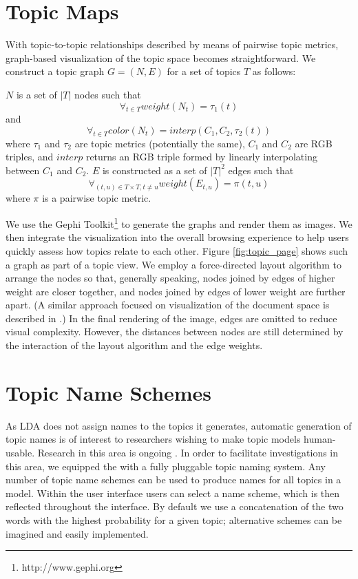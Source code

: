 \documentclass[11pt]{article}
\begin{document}
\section{Topic Maps}\label{sec:maps}
With topic-to-topic relationships described by means of pairwise topic metrics,
graph-based visualization of the topic space becomes straightforward.  We
construct a topic graph $G = (N, E)$ for a set of topics $T$ as follows:

$N$ is a set of $|T|$ nodes such that
\[\forall_{t\in T} weight(N_{t}) = \tau_{1}(t)\]
and
\[\forall_{t\in T} color(N_{t}) = interp(C_{1}, C_{2}, \tau_{2}(t))\]
where $\tau_1$ and $\tau_2$ are topic metrics (potentially the same), $C_{1}$ and
$C_{2}$ are RGB triples, and $interp$ returns an RGB triple formed by linearly interpolating
between $C_{1}$ and $C_{2}$. $E$ is
constructed as a set of $|T|^2$ edges such that
  \[\forall_{(t,u)\in T\times T, t\neq u} weight(E_{t,u}) = \pi(t,u)\]
where $\pi$ is a pairwise topic metric.

We use the Gephi Toolkit\footnote{http://www.gephi.org} to generate the graphs and
render them as images. We then integrate the visualization into the overall
browsing experience to help users quickly assess how topics relate to each
other. Figure \ref{fig:topic_page} shows such a graph as part of a topic view. 
We employ a force-directed layout algorithm to arrange
the nodes so that, generally speaking, nodes joined by edges of higher weight
are closer together, and nodes joined by edges of lower weight are further
apart. (A similar approach focused on visualization of the document space is
described in .) In the final rendering of the image, edges 
are omitted to reduce visual complexity. However, the distances between nodes
are still determined by the interaction of the layout algorithm and the edge
weights.

\section{Topic Name Schemes}
As LDA does not assign names to the topics it generates, automatic generation of
topic names is of interest to researchers wishing to make topic models
human-usable. Research in this area is ongoing \cite{Mei2007,Lau2010}. In order to
facilitate investigations in this area, we equipped the \tool{} with a
fully pluggable topic naming system. Any number of topic name schemes can be
used to produce names for all topics in a model. Within the user interface
users can select a name scheme, which is then reflected throughout the
interface. By default we use a concatenation of the two
words with the highest probability for a given topic; alternative schemes
can be imagined and easily implemented.%
\end{document}
